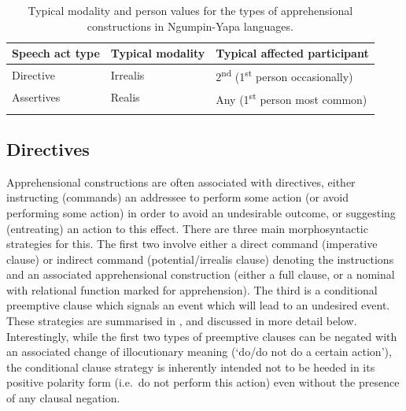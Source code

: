 \documentclass[output=paper,colorlinks,citecolor=brown]{langscibook}
\begin{document}
\begin{table}

\caption{Typical modality and person values for the types of apprehensional constructions in Ngumpin-Yapa languages.}
\label{tab9-bro}
\begin{tabular}{lll}
\lsptoprule
Speech act type & Typical modality & Typical affected participant \\ \midrule
Directive & Irrealis & 2\textsuperscript{nd} (1\textsuperscript{st} person occasionally) \\
Assertives & Realis & Any (1\textsuperscript{st} person most common) \\ 
\lspbottomrule
\end{tabular}
\end{table}


\subsection{Directives}
\label{subsec:directives}

Apprehensional constructions are often associated with directives, either instructing (commands) an addressee to perform some action (or avoid performing some action) in order to avoid an undesirable outcome, or suggesting (entreating) an action to this effect. There are three main morphosyntactic strategies for this. The first two involve either a direct command (imperative clause) or indirect command (potential/irrealis clause) denoting the instructions and an associated apprehensional construction (either a full clause, or a nominal with relational function marked for apprehension). The third is a conditional preemptive clause which signals an event which will lead to an undesired event. These strategies are summarised in , and discussed in more detail below. Interestingly, while the first two types of preemptive clauses can be negated with an associated change of illocutionary meaning (`do/do not do a certain action'), the conditional clause strategy is inherently intended not to be heeded in its positive polarity form (i.e.\  do not perform this action) even without the presence of any clausal negation.
\end{document}
